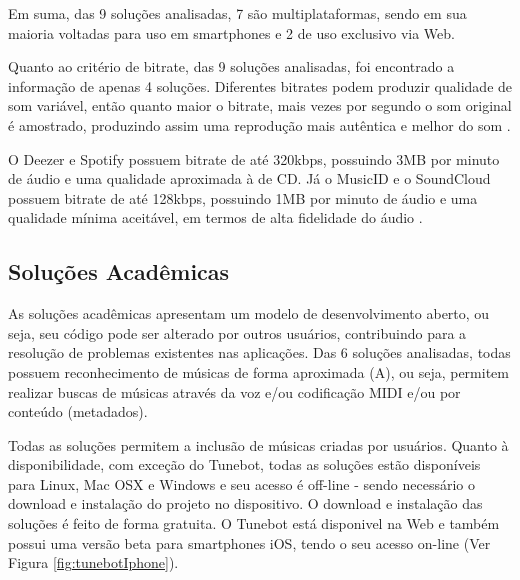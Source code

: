 Em suma, das 9 soluções analisadas, 7 são multiplataformas, sendo em sua maioria voltadas para uso em smartphones e 2 de uso exclusivo via Web.


Quanto ao critério de bitrate, das 9 soluções analisadas, foi encontrado a informação de apenas 4 soluções. Diferentes bitrates podem produzir qualidade de som variável, então quanto maior o bitrate, mais vezes por segundo o som original é amostrado, produzindo assim uma reprodução mais autêntica e melhor do som \cite{sandisk}.

O Deezer e Spotify possuem bitrate de até 320kbps, possuindo 3MB por minuto de áudio e uma qualidade aproximada à de CD. Já o MusicID e o SoundCloud possuem bitrate de até 128kbps, possuindo 1MB por minuto de áudio e uma qualidade mínima aceitável, em termos de alta fidelidade do áudio \cite{sean2012}.


\subsection{Soluções Acadêmicas}

As soluções acadêmicas apresentam um modelo de desenvolvimento aberto, ou seja, seu código pode ser alterado por outros usuários, contribuindo para a resolução de problemas existentes nas aplicações. Das 6 soluções analisadas, todas possuem reconhecimento de músicas de forma aproximada (A), ou seja, permitem realizar buscas de músicas através da voz e/ou codificação MIDI e/ou por conteúdo (metadados).



Todas as soluções permitem a inclusão de músicas criadas por usuários. Quanto à disponibilidade, com exceção do Tunebot, todas as soluções estão disponíveis para Linux, Mac OSX e Windows e seu acesso é off-line - sendo necessário o download e instalação do projeto no dispositivo. O download e instalação das soluções é feito de forma gratuita. O Tunebot está disponivel na Web e também possui uma versão beta para smartphones iOS, tendo o seu acesso on-line (Ver Figura \ref{fig:tunebotIphone}).

